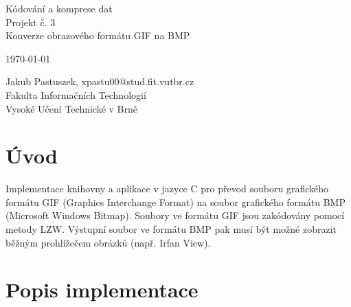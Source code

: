 \documentclass[a4paper,12pt,times]{article}
\begin{document}

\pagestyle{empty}

\begin{titlepage}
{\bfseries{\centering


	\begin{figure}[h!]
		\centering
	\end{figure}
	
	
	\Large
	Kódování a komprese dat\\
	\Huge
	Projekt č. 3\\
	\LARGE
	Konverze obrazového formátu GIF na BMP\\


	\large
	\today\par
}}

	
	\Large
	\noindent
	Jakub Pastuszek, xpastu00@stud.fit.vutbr.cz\\
	Fakulta Informačních Technologií\\
	Vysoké Učení Technické v Brně

\end{titlepage}

\pagestyle{plain}
\setcounter{page}{1}


\section{Úvod}

Implementace knihovny a aplikace v jazyce C pro převod souboru grafického formátu GIF (Graphics Interchange Format) na soubor grafického formátu BMP (Microsoft Windows Bitmap). Soubory ve formátu GIF jsou zakódovány pomocí metody LZW. Výstupní soubor ve formátu BMP pak musí být možné zobrazit běžným prohlížečem obrázků (např. Irfan View).

\section{Popis implementace}
\end{document}
